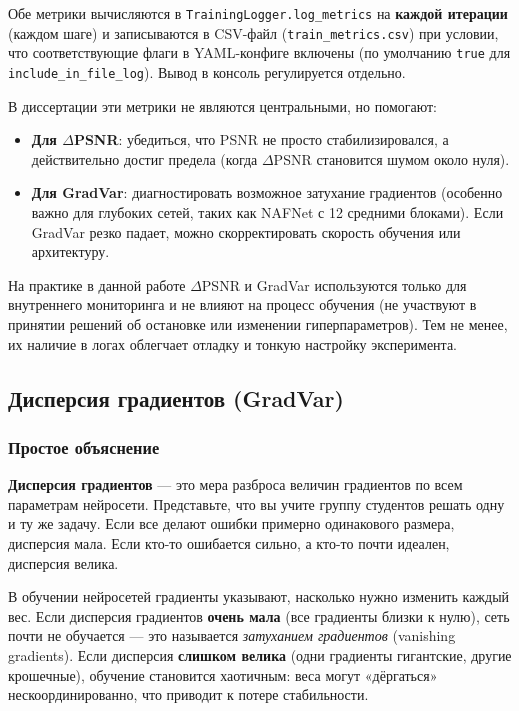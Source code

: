 \documentclass[12pt,a4paper]{article}
\begin{document}
Обе метрики вычисляются в \texttt{TrainingLogger.log\_metrics} на \textbf{каждой итерации} (каждом шаге) и записываются в CSV-файл (\texttt{train\_metrics.csv}) при условии, что соответствующие флаги в YAML-конфиге включены (по умолчанию \texttt{true} для \texttt{include\_in\_file\_log}). Вывод в консоль регулируется отдельно.

В диссертации эти метрики не являются центральными, но помогают:
\begin{itemize}
    \item \textbf{Для \(\Delta\)PSNR}: убедиться, что PSNR не просто стабилизировался, а действительно достиг предела (когда \(\Delta\)PSNR становится шумом около нуля).
    \item \textbf{Для GradVar}: диагностировать возможное затухание градиентов (особенно важно для глубоких сетей, таких как NAFNet с 12 средними блоками). Если GradVar резко падает, можно скорректировать скорость обучения или архитектуру.
\end{itemize}

На практике в данной работе \(\Delta\)PSNR и GradVar используются только для внутреннего мониторинга и не влияют на процесс обучения (не участвуют в принятии решений об остановке или изменении гиперпараметров). Тем не менее, их наличие в логах облегчает отладку и тонкую настройку эксперимента.

\subsection{Дисперсия градиентов (GradVar)}

\subsubsection{Простое объяснение}

\textbf{Дисперсия градиентов} — это мера разброса величин градиентов по всем параметрам нейросети. Представьте, что вы учите группу студентов решать одну и ту же задачу. Если все делают ошибки примерно одинакового размера, дисперсия мала. Если кто-то ошибается сильно, а кто-то почти идеален, дисперсия велика.

В обучении нейросетей градиенты указывают, насколько нужно изменить каждый вес. Если дисперсия градиентов \textbf{очень мала} (все градиенты близки к нулю), сеть почти не обучается — это называется \textit{затуханием градиентов} (vanishing gradients). Если дисперсия \textbf{слишком велика} (одни градиенты гигантские, другие крошечные), обучение становится хаотичным: веса могут «дёргаться» нескоординированно, что приводит к потере стабильности.
\end{document}

